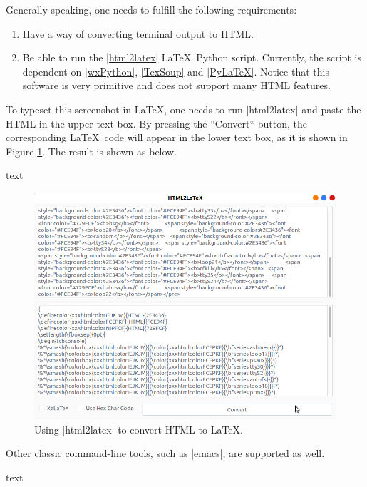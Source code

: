 \documentclass[letterpaper, 11pt, DIV=11]{scrartcl}
\begin{document}
Generally speaking, one needs to fulfill the following requirements:
\begin{enumerate}
\item Have a way of converting terminal output to HTML.
\item Be able to run the \href{https://github.com/xziyue/latex-beautiful-listings-screenshot/blob/master/html2tex_gui.py}{\rawinline|html2latex|} \LaTeX\ Python script. Currently, the script is dependent on \href{https://pypi.org/project/wxPython/}{\rawinline|wxPython|}, \href{https://pypi.org/project/TexSoup/}{\rawinline|TexSoup|} and \href{https://pypi.org/project/PyLaTeX/}{\rawinline|PyLaTeX|}. Notice that this software is very primitive and does not support many HTML features.
\end{enumerate}

To typeset this screenshot in \LaTeX, one needs to run \rawinline|html2latex| and paste the HTML in the upper text box. By pressing the ``Convert`` button, the corresponding \LaTeX\ code will appear in the lower text box, as it is shown in Figure \ref{fig:python-html2latex}. The result is shown as below.

\begin{tcbsrccode}{text}

\end{tcbsrccode}


\begin{figure}[htpb]
\centering
\includegraphics[width=0.7\linewidth]{../res/html2latex}
\caption{Using \rawinline|html2latex| to convert HTML to \LaTeX.}
\label{fig:python-html2latex}
\end{figure} 

Other classic command-line tools, such as \rawinline|emacs|, are supported as well.

\begin{tcbsrccode}{text}

\end{tcbsrccode}

\end{document}
